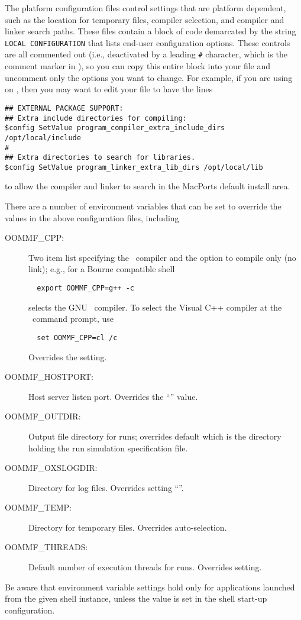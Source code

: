 The platform configuration files control settings that are platform
dependent, such as the location for temporary files, compiler selection,
and compiler and linker search paths. These files contain a block of
code demarcated by the string \verb+LOCAL CONFIGURATION+ that lists
end-user configuration options. These controls are all commented out
(i.e., deactivated by a leading \verb+#+ character, which is the comment
marker in \Tcl), so you can copy this entire block into your
 file and uncomment only the options you want
to change. For example, if you are using
on \MacOSX, then you
may want to edit your  file
to have the lines
\begin{verbatim}
## EXTERNAL PACKAGE SUPPORT:
## Extra include directories for compiling:
$config SetValue program_compiler_extra_include_dirs /opt/local/include
#
## Extra directories to search for libraries.
$config SetValue program_linker_extra_lib_dirs /opt/local/lib
\end{verbatim}
to allow the compiler and linker to search in the MacPorts default
install area.

There are a number of environment
variables that can be set to
override the values in the above configuration files, including
\begin{description}
\item[OOMMF\_CPP:] Two item list specifying the \Cplusplus\ compiler and
  the option to compile only (no link); e.g., for a Bourne compatible shell
\begin{verbatim}
  export OOMMF_CPP=g++ -c
\end{verbatim}
selects the GNU \Cplusplus\ compiler. To select the Visual C++ compiler
at the \Windows\ command prompt, use
\begin{verbatim}
  set OOMMF_CPP=cl /c
\end{verbatim}
Overrides the  
setting.
\item[OOMMF\_HOSTPORT:] Host server listen port. Overrides the
   ``'' value.
\item[OOMMF\_OUTDIR:] Output file directory for  runs;
  overrides default which is the directory holding the run 
  simulation specification file.
\item[OOMMF\_OXSLOGDIR:] Directory for  log files. Overrides
   setting ``''.
\item[OOMMF\_TEMP:] Directory for temporary files. Overrides auto-selection.
\item[OOMMF\_THREADS:] Default number of execution threads for 
  runs. Overrides   setting.
\end{description}
Be aware that environment variable settings hold only for applications
launched from the given shell instance, unless the value is set in the
shell start-up configuration.

